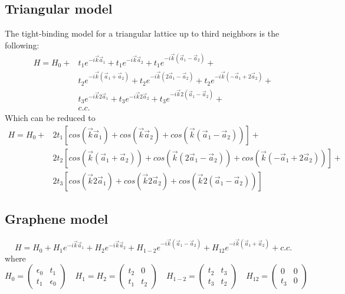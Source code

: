 \subsection{Triangular model}
The tight-binding model for a triangular lattice up to third neighbors is the following:
\begin{equation}
  \begin{split}
  H = H_0 +
      &t_1e^{-i\vec{k}\vec{a}_1} + t_1e^{-i\vec{k}\vec{a}_2} + t_1e^{-i\vec{k}(\vec{a}_1-\vec{a}_2)}+\\
      &t_2e^{-i\vec{k}(\vec{a}_1+\vec{a}_2)} + t_2e^{-i\vec{k}(2\vec{a}_1-\vec{a}_2)} +
      t_2e^{-i\vec{k}(-\vec{a}_1+2\vec{a}_2)}+\\
      &t_3e^{-i\vec{k}2\vec{a}_1} + t_3e^{-i\vec{k}2\vec{a}_2} + t_3e^{-i\vec{k}2(\vec{a}_1-\vec{a}_2)}+\\
      &c.c.
    \end{split}
\end{equation}
Which can be reduced to
\begin{equation}
  \begin{split}
  H = H_0 +
      &2t_1\left[cos(\vec{k}\vec{a}_1) + cos(\vec{k}\vec{a}_2) + cos(\vec{k}(\vec{a}_1-\vec{a}_2))\right]+\\
      &2t_2\left[cos(\vec{k}(\vec{a}_1+\vec{a}_2)) + cos(\vec{k}(2\vec{a}_1-\vec{a}_2)) +
      cos(\vec{k}(-\vec{a}_1+2\vec{a}_2))\right]+\\
      &2t_3\left[cos(\vec{k}2\vec{a}_1) + cos(\vec{k}2\vec{a}_2) + cos(\vec{k}2(\vec{a}_1-\vec{a}_2))\right]
    \end{split}
\end{equation}

\subsection{Graphene model}
\begin{equation}
  H = H_0 + H_1e^{-i\vec{k}\vec{a}_1} + H_2e^{-i\vec{k}\vec{a}_2}+
      H_{1-2}e^{-i\vec{k}(\vec{a}_1-\vec{a}_2)}+
      H_{12}e^{-i\vec{k}(\vec{a}_1+\vec{a}_2)} + c.c.
\end{equation}
where
\begin{equation}
  H_0 = \left(\begin{array}{cc}
    \epsilon_0 & t_1 \\
    t_1 & \epsilon_0
  \end{array}\right)\quad
  H_1 = H_2 = \left(\begin{array}{cc}
    t_2 & 0 \\
    t_1 & t_2
  \end{array}\right)\quad
  H_{1-2} = \left(\begin{array}{cc}
    t_2 & t_3 \\
    t_3 & t_2
  \end{array}\right)\quad
  H_{12} = \left(\begin{array}{cc}
    0 & 0 \\
    t_3 & 0
  \end{array}\right)
\end{equation}

